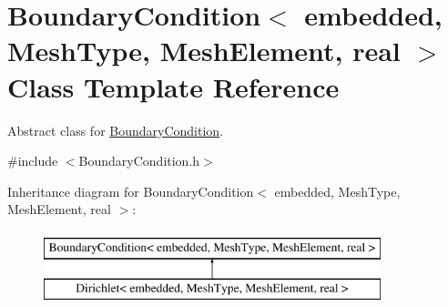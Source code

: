 \hypertarget{class_boundary_condition}{\section{\-Boundary\-Condition$<$ embedded, \-Mesh\-Type, \-Mesh\-Element, real $>$ \-Class \-Template \-Reference}
\label{class_boundary_condition}
}


\-Abstract class for \hyperlink{class_boundary_condition}{\-Boundary\-Condition}.  




{\ttfamily \#include $<$\-Boundary\-Condition.\-h$>$}

\-Inheritance diagram for \-Boundary\-Condition$<$ embedded, \-Mesh\-Type, \-Mesh\-Element, real $>$\-:\begin{figure}[H]
\begin{center}
\leavevmode
\includegraphics[height=2.000000cm]{class_boundary_condition}
\end{center}
\end{figure}
